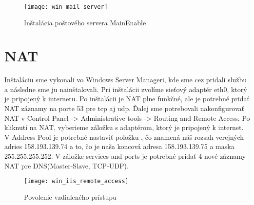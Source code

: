 \begin{figure}[!htb]
\centering
\texttt{[image: win\_mail\_server]}
\caption{Inštalácia poštového servera MainEnable}
\label{fig:x win_mail}
\end{figure}

\section{NAT}
\paragraph{}
Inštaláciu sme vykonali vo Windows Server Manageri, kde sme cez  pridali službu  a následne sme ju nainštalovali. Pri inštalácii zvolíme sie\v{t}ový adaptér eth0, ktorý je pripojený k internetu. Po inštalácii je NAT plne funkčné, ale je potrebné prida\v{t} NAT záznamy na porte 53 pre tcp aj udp.  Ďalej sme potrebovali nakonfigurovať NAT v Control Panel -\textgreater{} Administrative tools -\textgreater{} Routing and Remote Access. Po kliknutí na NAT, vyberieme záložku s adaptérom, ktorý je pripojený k internet. V Address Pool je potrebné nastavi\v{t} položku , čo znamená náš rozsah verejných adries 158.193.139.74 a to, čo je naša koncová adresa 158.193.139.75 a maska 255.255.255.252. V záložke services and ports je potrebné prida\v{t} 4 nové záznamy NAT pre DNS(Master-Slave, TCP-UDP).

\begin{figure}[!htb]
\centering
\texttt{[image: win\_iis\_remote\_access]}
\caption{Povolenie vzdialeného prístupu}
\label{fig:x win_web}
\end{figure}
